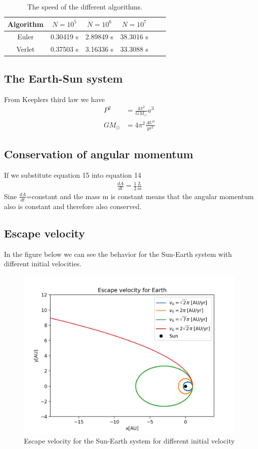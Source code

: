 \documentclass{article}
\begin{document}
\begin{multicols}{2}
\begin{table}[H]
\begin{center}
\begin{tabular}{  |c|c|c|c|c|c| } \hline
Algorithm&$N=10^5$&$N=10^6$&$N=10^7$ \\ \hline
Euler&0.30419 s&2.89849 s&38.3016 s\\ \hline
Verlet&0.37503 s&3.16336 s &33.3088 s \\ \hline
\end{tabular}
\caption{The speed of the different algorithms.}
\label{tab:Algo_N}
\end{center}
\end{table}

\subsection{The Earth-Sun system}
From Keeplers third law we have
\begin{align}
    P^2&=\frac{4\pi^2}{GM_\odot}a^3\\
    GM_\odot&=4\pi^2\frac{AU^3}{yr^2}
\end{align}
\subsection{Conservation of angular momentum}
If we substitute equation 15 into equation 14 
\begin{align}
    \frac{dA}{dt}=\frac{1}{2}\frac{L}{m}
\end{align}
Sine $\frac{dA}{dt}$=constant and the mass m is constant means that the angular momentum also is constant and therefore also conserved.  
\\
\subsection{Escape velocity}
In the figure below we can see the behavior for the Sun-Earth system with different initial velocities. 
\begin{figure}[H]
	\centering
	\includegraphics[width=\linewidth]{esc_vel_plot.png}
	\caption{Escape velocity for the Sun-Earth system for different initial velocity}
	\label{fig:1bplot}
\end{figure}


\end{multicols}
\end{document}
